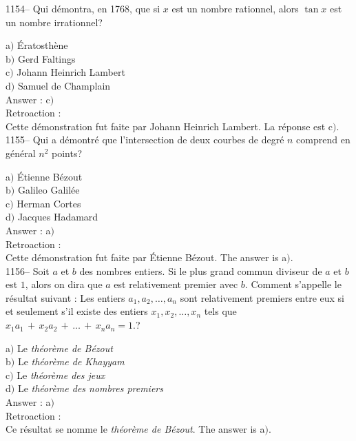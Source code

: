 ﻿\documentclass[letterpaper, 12pt]{article}
\begin{document}
1154-- Qui d\'emontra, en 1768, que si $x$ est un nombre rationnel,
alors $\tan x$ est un nombre irrationnel?

a$)$ \'Eratosth\`ene \\
b$)$ Gerd Faltings \\
c$)$ Johann Heinrich Lambert \\
d$)$ Samuel de Champlain\\

Answer : c$)$\\

Retroaction : \\
Cette d\'emonstration fut faite par Johann Heinrich Lambert. La r\'eponse
est c$)$.\\

1155-- Qui a d\'emontr\'e que l'intersection de deux courbes de
degr\'e $n$ comprend en g\'en\'eral $n^2$ points?

a$)$ \'Etienne B\'ezout \\
b$)$ Galileo Galil\'ee \\
c$)$ Herman Cortes \\
d$)$ Jacques Hadamard\\

Answer : a$)$\\

Retroaction : \\
Cette d\'emonstration fut faite par \'Etienne B\'ezout. The answer is
a$)$.\\

1156-- Soit $a$ et $b$ des nombres entiers. Si le plus grand commun
diviseur de $a$ et $b$ est $1$, alors on dira que $a$ est
relativement premier avec $b$. Comment s'appelle le r\'esultat
suivant : \og Les entiers $a_1,a_2,\ldots,a_n$ sont relativement
premiers entre eux si et seulement s'il existe des entiers
$x_1,x_2,\ldots,x_n$ tels que
$x_1a_1\,+\,x_2a_2\,+\,\ldots\,+\,x_na_n=1.$\fg ?

a$)$ Le {\sl th\'eor\`eme de B\'ezout} \\
b$)$ Le {\sl th\'eor\`eme de Khayyam} \\
c$)$ Le {\sl th\'eor\`eme des jeux} \\
d$)$ Le {\sl th\'eor\`eme des nombres premiers}\\

Answer : a$)$\\

Retroaction : \\
Ce r\'esultat se nomme le {\sl th\'eor\`eme de B\'ezout}. The answer is
a$)$.\\
\end{document}
